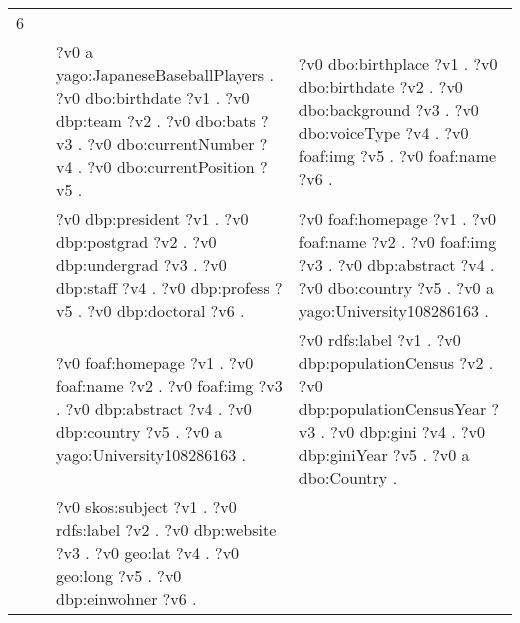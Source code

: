 \begin{table}
{\begin{tabular}{!{\color{white}\vrule}l!{\color{white}\vrule}c@{\hs}!{\color{white}\vrule}p{11.5cm}!{\color{white}\vrule}p{11.5cm}!{\color{white}\vrule}}
			\midrule
			6 & \phantom{a} & \\
			 &  \phantom{a} &     ?v0 a yago:JapaneseBaseballPlayers .  ?v0 dbo:birthdate ?v1 .  ?v0 dbp:team ?v2 .  ?v0 dbo:bats ?v3 .  ?v0 dbo:currentNumber ?v4 .  ?v0 dbo:currentPosition ?v5 . &  ?v0 dbo:birthplace ?v1 .  ?v0 dbo:birthdate ?v2 .  ?v0 dbo:background ?v3 .  ?v0 dbo:voiceType ?v4 .  ?v0 foaf:img ?v5 .  ?v0 foaf:name ?v6 . \\
			 &  \phantom{a} &     ?v0 dbp:president ?v1 .  ?v0 dbp:postgrad ?v2 .  ?v0 dbp:undergrad ?v3 .  ?v0 dbp:staff ?v4 .  ?v0 dbp:profess ?v5 .  ?v0 dbp:doctoral ?v6 . &  ?v0 foaf:homepage ?v1 .  ?v0 foaf:name ?v2 .  ?v0 foaf:img ?v3 .  ?v0 dbp:abstract ?v4 .  ?v0 dbo:country ?v5 .  ?v0 a yago:University108286163 . \\
			 &  \phantom{a} &     ?v0 foaf:homepage ?v1 .  ?v0 foaf:name ?v2 .  ?v0 foaf:img ?v3 .  ?v0 dbp:abstract ?v4 .  ?v0 dbp:country ?v5 .  ?v0 a yago:University108286163 . &  ?v0 rdfs:label ?v1 .  ?v0 dbp:populationCensus ?v2 .  ?v0 dbp:populationCensusYear ?v3 .  ?v0 dbp:gini ?v4 .  ?v0 dbp:giniYear ?v5 .  ?v0 a dbo:Country . \\
			 &  \phantom{a} &     ?v0 skos:subject ?v1 .  ?v0 rdfs:label ?v2 .  ?v0 dbp:website ?v3 .  ?v0 geo:lat ?v4 .  ?v0 geo:long ?v5 .  ?v0 dbp:einwohner ?v6 . &  \\
			\bottomrule
		\end{tabular}
	}
\end{table}